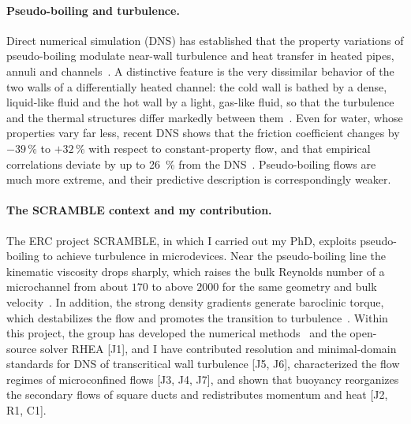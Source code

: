 \documentclass[11pt]{article}
\begin{document}
\paragraph{Pseudo-boiling and turbulence.} Direct numerical simulation (DNS) has
established that the property variations of pseudo-boiling modulate near-wall turbulence
and heat transfer in heated pipes, annuli and channels~\cite{Bae2005,Peeters2016,Nemati2016,Kawai2019,Guo2022,Wan2025}.
A distinctive feature is the very dissimilar behavior of the two walls of a differentially
heated channel: the cold wall is bathed by a dense, liquid-like fluid and the hot wall by a
light, gas-like fluid, so that the turbulence and the thermal structures differ markedly
between them~\cite{Ma2018,Guo2022,ElMansy2025}. Even for water, whose properties vary far less, recent
DNS shows that the friction coefficient changes by $-39\,\%$ to $+32\,\%$ with respect to
constant-property flow, and that empirical correlations deviate by up to 26~\% from the
DNS~\cite{Modesti2026}. Pseudo-boiling flows are much more extreme, and their predictive
description is correspondingly weaker.

\paragraph{The SCRAMBLE context and my contribution.} The ERC project SCRAMBLE, in which I
carried out my PhD, exploits pseudo-boiling to achieve turbulence in microdevices. Near the
pseudo-boiling line the kinematic viscosity drops sharply, which raises the bulk Reynolds
number of a microchannel from about $170$ to above $2000$ for the same geometry and bulk
velocity~\cite{Hurtan2025}. In addition, the strong density gradients generate baroclinic
torque, which destabilizes the flow and promotes the transition to
turbulence~\cite{Bernades2023,Bernades2025}. Within this project, the group has developed the
numerical methods~\cite{BernadesKEEP2023} and the open-source solver RHEA [J1], and I have
contributed resolution and minimal-domain standards for DNS of transcritical wall turbulence
[J5, J6], characterized the flow regimes of microconfined flows [J3, J4, J7], and shown that
buoyancy reorganizes the secondary flows of square ducts and redistributes momentum and heat
[J2, R1, C1].
\end{document}
